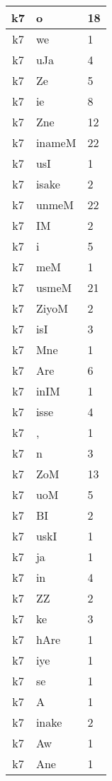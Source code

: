\documentclass[a4 paper]{article}
\begin{document}
\begin{longtable}{cp{}p{}}
\midrule k7 & o & 18\\ \midrule k7 & we & 1\\ \midrule k7 & uJa & 4\\ \midrule k7 & Ze & 5\\ \midrule k7 & ie & 8\\ \midrule k7 & Zne & 12\\ \midrule k7 & inameM & 22\\ \midrule k7 & usI & 1\\ \midrule k7 & isake & 2\\ \midrule k7 & unmeM & 22\\ \midrule k7 & IM & 2\\ \midrule k7 & i & 5\\ \midrule k7 & meM & 1\\ \midrule k7 & usmeM & 21\\ \midrule k7 & ZiyoM & 2\\ \midrule k7 & isI & 3\\ \midrule k7 & Mne & 1\\ \midrule k7 & Are & 6\\ \midrule k7 & inIM & 1\\ \midrule k7 & isse & 4\\ \midrule k7 & , & 1\\ \midrule k7 & n & 3\\ \midrule k7 & ZoM & 13\\ \midrule k7 & uoM & 5\\ \midrule k7 & BI & 2\\ \midrule k7 & uskI & 1\\ \midrule k7 & ja & 1\\ \midrule k7 & in & 4\\ \midrule k7 & ZZ & 2\\ \midrule k7 & ke & 3\\ \midrule k7 & hAre & 1\\ \midrule k7 & iye & 1\\ \midrule k7 & se & 1\\ \midrule k7 & A & 1\\ \midrule k7 & inake & 2\\ \midrule k7 & Aw & 1\\ \midrule k7 & Ane & 1\\ \midrule 

\end{longtable}
\end{document}
